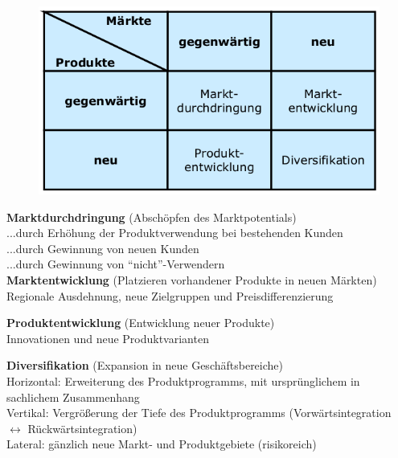 \documentclass[a4paper,11pt, twoside]{article}
\newcommand\mpar[1]{\marginpar {\flushleft\small #1}}
\begin{document}
\begin{figure}[h]
 \begin{center}
   \includegraphics[scale=0.3]{bilder/marketingstrategien.png}
 \end{center}
\end{figure}

\textbf{Marktdurchdringung} (Abschöpfen des Marktpotentials)\\
...durch Erhöhung der Produktverwendung bei bestehenden Kunden\\
...durch Gewinnung von neuen Kunden\\
...durch Gewinnung von "`nicht"'-Verwendern\\

\textbf{Marktentwicklung} (Platzieren vorhandener Produkte in neuen Märkten)\\
Regionale Ausdehnung, neue Zielgruppen und Preisdifferenzierung

\textbf{Produktentwicklung} (Entwicklung neuer Produkte)\\
Innovationen und neue Produktvarianten

\mpar{\textcolor{red}{risikoreichste Wachstumstrategie}}

\textbf{Diversifikation} (Expansion in neue Geschäftsbereiche)\\
Horizontal: Erweiterung des Produktprogramms, mit ursprünglichem in sachlichem Zusammenhang\\
Vertikal: Vergrößerung der Tiefe des Produktprogramms (Vorwärtsintegration $\leftrightarrow$ Rückwärtsintegration)\\
Lateral: gänzlich neue Markt- und Produktgebiete (risikoreich)\\
\end{document}
